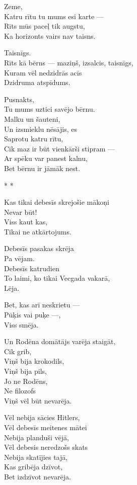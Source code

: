\documentclass[14pt]{extarticle}
\begin{document}
Zeme,\\
Katru rītu tu mums esi karte ---\\
Rīts mūs paceļ tik augstu,\\
Ka horizonts vairs nav taisns.

Taisnīgs.\\
Rīts kā bērns --- maziņš, izsalcis, taisnīgs,\\
Kuram vēl nedzidrās acīs\\
Dzidruma atspīdums.

Pusnakts,\\
Tu mums uztici savējo bērnu.\\
Malku un šauteni,\\
Un izsmieklu nēsājis, es\\
Saprotu katru rītu,\\
Cik maz ir būt vienkārši stipram ---\\
Ar spēku var panest kalnu,\\
Bet bērnu ir jāmāk nest.


\newpage

{\large \sc * * *}

Kas tikai debesīs skrejošie mākoņi\\
Nevar būt!\\
Viss kaut kas,\\
Tikai ne atkārtojums.

Debesīs pasakas skrēja\\
Pa vējam.\\
Debesīs katrudien\\
To laimi, ko tikai Vecgada vakarā,\\
Lēja.

Bet, kas arī neskrietu ---\\
Pūķis vai puķe ---,\\
Viss smēja.

Un Rodēna domātājs varēja staigāt,\\
Cik grib,\\
Viņš bija krokodils,\\
Viņš bija pils,\\
Jo ne Rodēns,\\
Ne filozofs\\
Viņš vēl būt nevarēja.

Vēl nebija sācies Hitlers,\\
Vēl debesīs meitenes mātei\\
Nebija planduši vējā,\\
Vēl debesis neredzošs skats\\
Nebija skatījies tajā,\\
Kas gribēja dzīvot,\\
Bet izdzīvot nevarēja.
\end{document}

